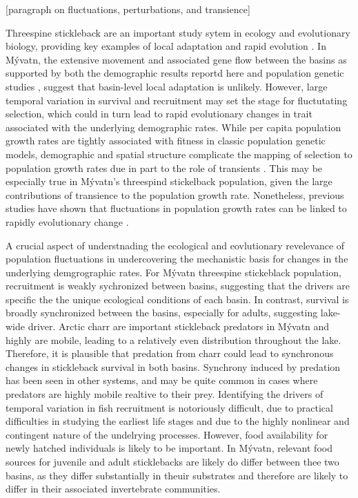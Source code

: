 \documentclass[11pt]{article}
\begin{document}
[paragraph on fluctuations, perturbations, and transience]

Threespine stickleback are an important study sytem in ecology and evolutionary biology,
providing key examples of local adaptation 
\citep{}
and rapid evolution
\citep{}.
In M\'{y}vatn, the extensive movement and associated gene flow between the basins 
as supported by both the demographic results reportd here 
and population genetic studies \citep{millet2013},
suggest that basin-level local adaptation is unlikely.
However, large temporal variation in survival and recruitment may set the 
stage for fluctutating selection, 
which could in turn lead to rapid evolutionary changes in trait associated 
with the underlying demographic rates.
While per capita population growth rates are tightly associated with fitness 
in classic population genetic models,
demographic and spatial structure complicate the mapping
of selection to population growth rates due in part to the role of transients
\citep{}.
This may be especially true in M\'{y}vatn's threespind stickelback population,
given the large contributions of transience to the population growth rate.
Nonetheless, previous studies have shown that fluctuations in population growth rates
can be linked to rapidly evolutionary change
\citep{}.

A crucial aspect of understnading the ecological and eovlutionary revelevance of 
population fluctuations in undercovering the mechanistic basis for changes in the underlying
demgrographic rates.
For M\'{y}vatn threespine stickeblack population,
recruitment is weakly sychronized between basins,
suggesting that the drivers are specific the the unique ecological conditions of each basin.
In contrast, survival is broadly synchronized between the basins, especially for adults,
suggesting lake-wide driver.
Arctic charr are important stickleback predators in M\'{y}vatn and highly are mobile,
leading to a relatively even distribution throughout the lake. 
Therefore, it is plausible that predation from charr could lead to synchronous 
changes in stickleback survival in both basins.
Synchrony induced by predation has been seen in other systems,
and may be quite common in cases where predators are highly mobile realtive to their prey.
Identifying the drivers of temporal variation in fish recruitment is notoriously difficult,
due to practical difficulties in studying the earliest life stages and due to
the highly nonlinear and contingent nature of the undelrying processes.
However, food availability for newly hatched individuals is likely to be important.
In M\'{y}vatn, relevant food sources for juvenile and adult sticklebacks are likely
do differ between thee two basins,
as they differ substantially in theuir substrates and therefore are likely 
to differ in their associated invertebrate communities.
\end{document}
